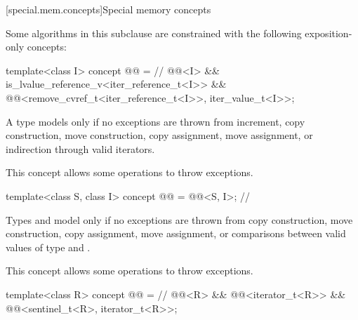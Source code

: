 [special.mem.concepts]{Special memory concepts}

\pnum
Some algorithms in this subclause are constrained with the following
exposition-only concepts:

\begin{itemdecl}
template<class I>
concept @@ = // \expos
  @@<I> &&
  is_lvalue_reference_v<iter_reference_t<I>> &&
  @@<remove_cvref_t<iter_reference_t<I>>, iter_value_t<I>>;
\end{itemdecl}

\begin{itemdescr}
\pnum
A type  models  only if
no exceptions are thrown from increment,
copy construction, move construction,
copy assignment, move assignment,
or indirection through valid iterators.

\pnum
\begin{note}
This concept allows some 
operations to throw exceptions.
\end{note}
\end{itemdescr}

\begin{itemdecl}
template<class S, class I>
concept @@ = @@<S, I>; // \expos
\end{itemdecl}

\begin{itemdescr}
\pnum
Types  and  model 
only if no exceptions are thrown from copy construction, move construction,
copy assignment, move assignment, or comparisons between
valid values of type  and .

\pnum
\begin{note}
This concept allows some 
operations to throw exceptions.
\end{note}
\end{itemdescr}

\begin{itemdecl}
template<class R>
concept @@ = // \expos
  @@<R> &&
  @@<iterator_t<R>> &&
  @@<sentinel_t<R>, iterator_t<R>>;
\end{itemdecl}

